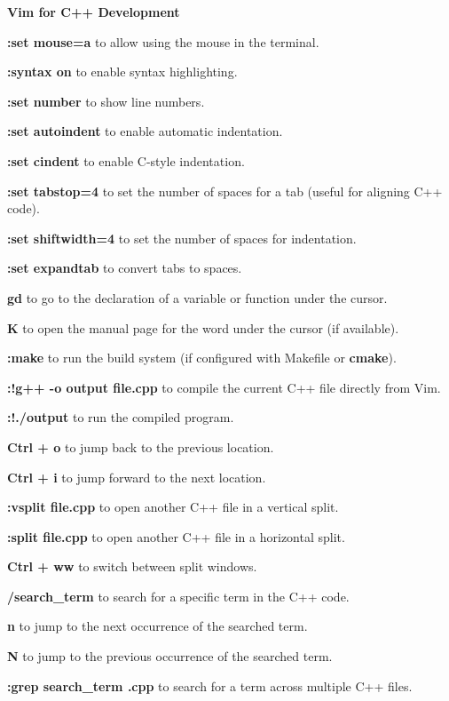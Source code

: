\documentclass[fontsize=8pt, a4paper, landscape, fleqn]{scrartcl}
\renewcommand{\section}[1]{%
    \noindent\colorbox{sectioncolor}{%
        \parbox{\dimexpr\columnwidth-2\fboxsep}{\color{white}\textbf{#1}}}%
    \vspace{0.5mm}%
}
\begin{document}
\begin{multicols*}{3}[\raggedcolumns]
\section{Vim for C++ Development}

\textbf{:set mouse=a} to allow using the mouse in the terminal.

\textbf{:syntax on} to enable syntax highlighting.

\textbf{:set number} to show line numbers.

\textbf{:set autoindent} to enable automatic indentation.

\textbf{:set cindent} to enable C-style indentation.

\textbf{:set tabstop=4} to set the number of spaces for a tab (useful for aligning C++ code).

\textbf{:set shiftwidth=4} to set the number of spaces for indentation.

\textbf{:set expandtab} to convert tabs to spaces.

\textbf{gd} to go to the declaration of a variable or function under the cursor.

\textbf{K} to open the manual page for the word under the cursor (if available).

\textbf{:make} to run the build system (if configured with Makefile or \textbf{cmake}).

\textbf{:!g++ -o output file.cpp} to compile the current C++ file directly from Vim.

\textbf{:!./output} to run the compiled program.

\textbf{Ctrl + o} to jump back to the previous location.

\textbf{Ctrl + i} to jump forward to the next location.

\textbf{:vsplit file.cpp} to open another C++ file in a vertical split.

\textbf{:split file.cpp} to open another C++ file in a horizontal split.

\textbf{Ctrl + ww} to switch between split windows.

\textbf{/search\_term} to search for a specific term in the C++ code.

\textbf{n} to jump to the next occurrence of the searched term.

\textbf{N} to jump to the previous occurrence of the searched term.

\textbf{:grep search\_term \*.cpp} to search for a term across multiple C++ files.
    
    \pagebreak

\end{multicols*}
\end{document}
